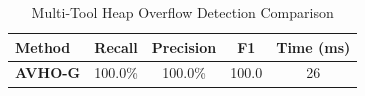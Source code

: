 \begin{table}[htbp]
  \centering
  \caption{Multi-Tool Heap Overflow Detection Comparison}
  \label{tab:multitool}
  \begin{tabular}{lcccc}
    \toprule
    \textbf{Method} & \textbf{Recall} & \textbf{Precision} & \textbf{F1} & \textbf{Time (ms)} \\
    \midrule
    \textbf{AVHO-G} & 100.0\% & 100.0\% & 100.0 & 26 \\
    \bottomrule
  \end{tabular}
\end{table}